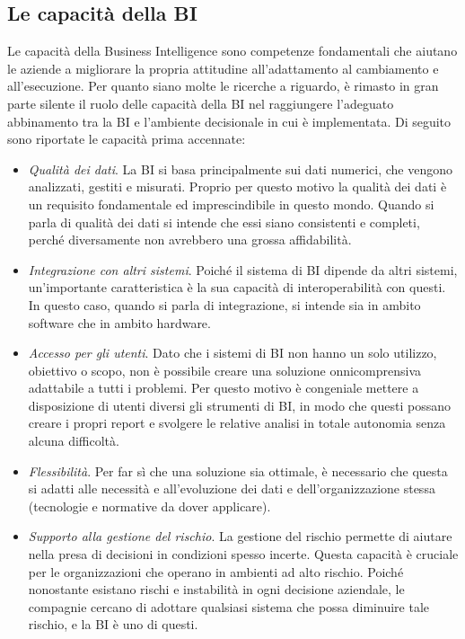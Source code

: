 \subsection{Le capacità della BI}

Le capacità della Business Intelligence sono competenze fondamentali che aiutano le aziende a migliorare la propria attitudine all'adattamento al cambiamento e all'esecuzione. Per quanto siano molte le ricerche a riguardo, è rimasto in gran parte silente il ruolo delle capacità della BI nel raggiungere l'adeguato abbinamento tra la BI e l'ambiente decisionale in cui è implementata.
Di seguito sono riportate le capacità prima accennate:\cite{bi_capabilities}

\begin{itemize}
    \item \textit{Qualità dei dati}. La BI si basa principalmente sui dati numerici, che vengono analizzati, gestiti e misurati. Proprio per questo motivo la qualità dei dati è un requisito fondamentale ed imprescindibile in questo mondo. Quando si parla di qualità dei dati si intende che essi siano consistenti e completi, perché diversamente non avrebbero una grossa affidabilità.
    \item \textit{Integrazione con altri sistemi}. Poiché il sistema di BI dipende da altri sistemi, un'importante caratteristica è la sua capacità di interoperabilità con questi. In questo caso, quando si parla di integrazione, si intende sia in ambito software che in ambito hardware.
    \item \textit{Accesso per gli utenti}. Dato che i sistemi di BI non hanno un solo utilizzo, obiettivo o scopo, non è possibile creare una soluzione onnicomprensiva adattabile a tutti i problemi. Per questo motivo è congeniale mettere a disposizione di utenti diversi gli strumenti di BI, in modo che questi possano creare i propri report e svolgere le relative analisi in totale autonomia senza alcuna difficoltà.
    \item \textit{Flessibilità}. Per far sì che una soluzione sia ottimale, è necessario che questa si adatti alle necessità e all'evoluzione dei dati e dell'organizzazione stessa (tecnologie e normative da dover applicare).
    \item \textit{Supporto alla gestione del rischio}. La gestione del rischio permette di aiutare nella presa di decisioni in condizioni spesso incerte. Questa capacità è cruciale per le organizzazioni che operano in ambienti ad alto rischio. Poiché nonostante esistano rischi e instabilità in ogni decisione aziendale, le compagnie cercano di adottare qualsiasi sistema che possa diminuire tale rischio, e la BI è uno di questi.
\end{itemize}

